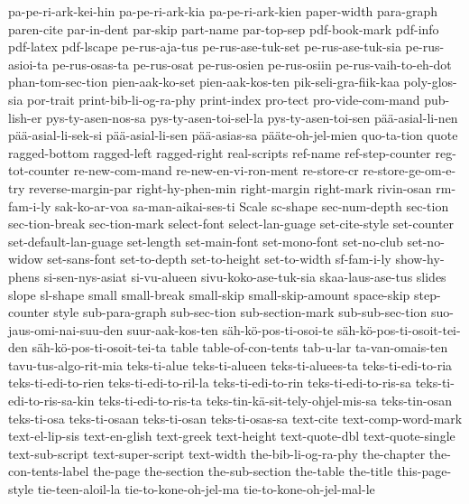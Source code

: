 {  pa-pe-ri-ark-kei-hin
  pa-pe-ri-ark-kia
  pa-pe-ri-ark-kien
  paper-width
  para-graph
  paren-cite
  par-in-dent
  par-skip
  part-name
  par-top-sep
  pdf-book-mark
  pdf-info
  pdf-latex
  pdf-lscape
  pe-rus-aja-tus
  pe-rus-ase-tuk-set
  pe-rus-ase-tuk-sia
  pe-rus-asioi-ta
  pe-rus-osas-ta
  pe-rus-osat
  pe-rus-osien
  pe-rus-osiin
  pe-rus-vaih-to-eh-dot
  phan-tom-sec-tion
  pien-aak-ko-set
  pien-aak-kos-ten
  pik-seli-gra-fiik-kaa
  poly-glos-sia
  por-trait
  print-bib-li-og-ra-phy
  print-index
  pro-tect
  pro-vide-com-mand
  pub-lish-er
  pys-ty-asen-nos-sa
  pys-ty-asen-toi-sel-la
  pys-ty-asen-toi-sen
  pää-asial-li-nen
  pää-asial-li-sek-si
  pää-asial-li-sen
  pää-asias-sa
  pääte-oh-jel-mien
  quo-ta-tion
  quote
  ragged-bottom
  ragged-left
  ragged-right
  real-scripts
  ref-name
  ref-step-counter
  reg-tot-counter
  re-new-com-mand
  re-new-en-vi-ron-ment
  re-store-cr
  re-store-ge-om-e-try
  reverse-margin-par
  right-hy-phen-min
  right-margin
  right-mark
  rivin-osan
  rm-fam-i-ly
  sak-ko-ar-voa
  sa-man-aikai-ses-ti
  Scale
  sc-shape
  sec-num-depth
  sec-tion
  sec-tion-break
  sec-tion-mark
  select-font
  select-lan-guage
  set-cite-style
  set-counter
  set-default-lan-guage
  set-length
  set-main-font
  set-mono-font
  set-no-club
  set-no-widow
  set-sans-font
  set-to-depth
  set-to-height
  set-to-width
  sf-fam-i-ly
  show-hy-phens
  si-sen-nys-asiat
  si-vu-alueen
  sivu-koko-ase-tuk-sia
  skaa-laus-ase-tus
  slides
  slope
  sl-shape
  small
  small-break
  small-skip
  small-skip-amount
  space-skip
  step-counter
  style
  sub-para-graph
  sub-sec-tion
  sub-section-mark
  sub-sub-sec-tion
  suo-jaus-omi-nai-suu-den
  suur-aak-kos-ten
  säh-kö-pos-ti-osoi-te
  säh-kö-pos-ti-osoit-tei-den
  säh-kö-pos-ti-osoit-tei-ta
  table
  table-of-con-tents
  tab-u-lar
  ta-van-omais-ten
  tavu-tus-algo-rit-mia
  teks-ti-alue
  teks-ti-alueen
  teks-ti-aluees-ta
  teks-ti-edi-to-ria
  teks-ti-edi-to-rien
  teks-ti-edi-to-ril-la
  teks-ti-edi-to-rin
  teks-ti-edi-to-ris-sa
  teks-ti-edi-to-ris-sa-kin
  teks-ti-edi-to-ris-ta
  teks-tin-kä-sit-tely-ohjel-mis-sa
  teks-tin-osan
  teks-ti-osa
  teks-ti-osaan
  teks-ti-osan
  teks-ti-osas-sa
  text-cite
  text-comp-word-mark
  text-el-lip-sis
  text-en-glish
  text-greek
  text-height
  text-quote-dbl
  text-quote-single
  text-sub-script
  text-super-script
  text-width
  the-bib-li-og-ra-phy
  the-chapter
  the-con-tents-label
  the-page
  the-section
  the-sub-section
  the-table
  the-title
  this-page-style
  tie-teen-aloil-la
  tie-to-kone-oh-jel-ma
  tie-to-kone-oh-jel-mal-le
}
